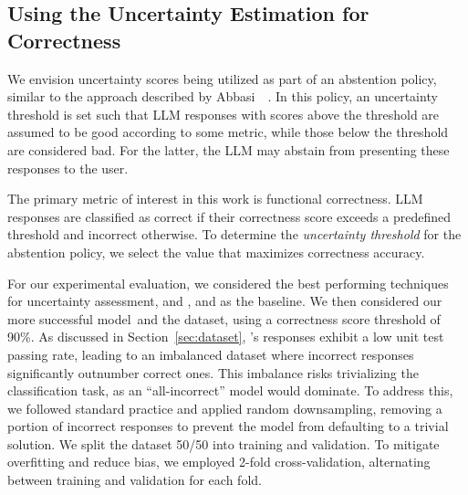 \subsection{Using the Uncertainty Estimation for Correctness}
\label{sec:usability}
We envision uncertainty scores being utilized as part of an abstention policy, similar to the approach described by Abbasi~\etal~\cite{abbasi2024believe}.
In this policy, an uncertainty threshold is set such that LLM responses with scores above the threshold are assumed to be good according to some metric, while those below the threshold are considered bad.
For the latter, the LLM may abstain from presenting these responses to the user.

The primary metric of interest in this work is functional correctness. LLM responses are classified as correct if their correctness score exceeds a predefined threshold and incorrect otherwise. To determine the \emph{uncertainty threshold} for the abstention policy, we select the value that maximizes correctness accuracy.

For our experimental evaluation, we considered the best performing techniques for uncertainty assessment, \SESymbolic and \SESymbolicUnif, and \LLMProbability as the baseline.
We then considered our more successful model~\gptturbo and the \livecodebench dataset, using a correctness score threshold of 90\%. 
%
As discussed in Section~\ref{sec:dataset}, \gptturbo's responses exhibit a low unit test passing rate, leading to an imbalanced dataset where incorrect responses significantly outnumber correct ones. This imbalance risks trivializing the classification task, as an ``all-incorrect'' model would dominate. To address this, we followed standard practice and applied random downsampling, removing a portion of incorrect responses to prevent the model from defaulting to a trivial solution. We split the dataset 50/50 into training and validation.
To mitigate overfitting and reduce bias,  we employed 2-fold cross-validation, alternating between training and validation for each fold.



